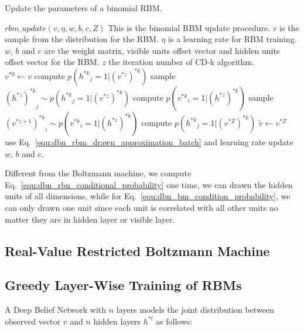 \documentclass[runningheads,openany]{xhlPaper}
\begin{document}
\begin{algorithm}
\caption{Update the parameters of a binomial RBM.}
\label{fig:rbm_training}
\begin{algorithmic}
\STATE $rbm\_update(v, \eta, w, b, c, Z)$
\STATE This is the binomial RBM update procedure.
\STATE $v$ is the sample from the distribution for the RBM.
\STATE $\eta$ is a learning rate for RBM training.
\STATE $w$, $b$ and $c$ are the weight matrix, visible units offset vector and hidden units offset vector for the RBM.
\STATE $z$ the iteration number of CD-k algorithm.
\\
\STATE $v^{*0} \leftarrow  v$
		\STATE compute $p\left( {{h^{*k}}_j = 1|{{\left( {{v^{*z}}} \right)}^{*k}}} \right)$
		\STATE sample ${\left( {{h^{*z}}} \right)^{*k}}_j \sim p\left( {{h^{*k}}_j = 1|{{\left( {{v^{*z}}} \right)}^{*k}}} \right)$
	\ENDFOR
		\STATE compute $p\left( {{v^{*k}}_i = 1|{{\left( {{h^{*z}}} \right)}^{*k}}} \right)$
		\STATE sample ${\left( {{v^{*z + 1}}} \right)^{*k}}_i \sim p\left( {{v^{*k}}_i = 1|{{\left( {{h^{*z}}} \right)}^{*k}}} \right)$
	\ENDFOR	
\ENDFOR	
{}
	\STATE compute $p\left( {{h^{*k}}_j = 1|{{\left( {{v^{*Z}}} \right)}^{*k}}} \right)$
\ENDFOR	
\STATE $\tilde v \leftarrow {v^{*Z}}$
\STATE use Eq.~\ref{equ:dbn_rbm_drawn_approximation_batch} and learning rate update $w$, $b$ and $c$.
\end{algorithmic}
\end{algorithm}

Different from the Boltzmann machine, we compute Eq.~\ref{equ:dbn_rbn_conditional_probability} one time, we can drawn the hidden units of all dimensions, while for Eq.~\ref{equ:dbn_bm_condition_probability}, we can only drawn one unit since each unit is correlated with all other units no matter they are in hidden layer or visible layer.


\subsection{Real-Value Restricted Boltzmann Machine}

\subsection{Greedy Layer-Wise Training of RBMs}
A Deep Belief Network with $n$ layers models the joint distribution between observed vector $v$ and $n$ hidden layers $h^{*l}$ as follows:
\end{document}
